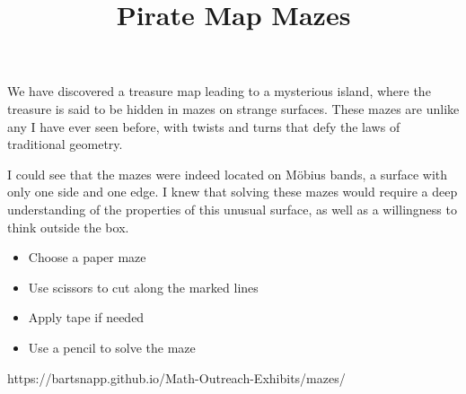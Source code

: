 \documentclass{../exhibit}
\title{Pirate Map Mazes}
\begin{document}
\begin{context} We have discovered a treasure map leading to a
mysterious island, where the treasure is said to be hidden in mazes on
strange surfaces. These mazes are unlike any I have ever seen before,
with twists and turns that defy the laws of traditional geometry.

I could see that the mazes were indeed located on M\"obius bands, a surface with only one side and one edge. I knew that solving these mazes would require a deep understanding of the properties of this unusual surface, as well as a willingness to think outside the box.
\end{context}

\begin{directions}
  \begin{itemize}
    \item Choose a paper maze
\item Use scissors to cut along the marked lines 
\item Apply tape if needed
  \item Use a pencil to solve the maze
\end{itemize}
\end{directions}

\begin{example}
\end{example}

\begin{mathConnections}
  https://bartsnapp.github.io/Math-Outreach-Exhibits/mazes/
\end{mathConnections}
\end{document}
